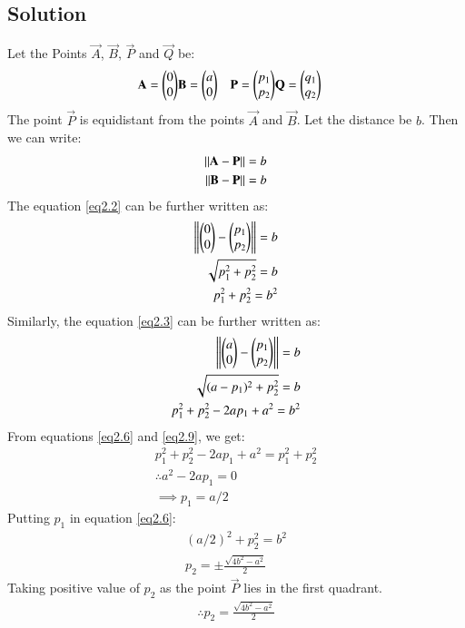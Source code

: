 \documentclass[journal,12pt,twocolumn]{IEEEtran}
\begin{document}
\subsection{Solution}
Let the Points $\vec{A}$, $\vec{B}$, $\vec{P}$ and $\vec{Q}$ be:
\begin{align}
    \mathbf{A}=\begin{pmatrix}0 \\ 0\end{pmatrix} & \mathbf{B}=\begin{pmatrix}a \\ 0\end{pmatrix} & \mathbf{P}=\begin{pmatrix}p_1 \\ p_2\end{pmatrix}&\mathbf{Q}=\begin{pmatrix}q_1 \\ q_2\end{pmatrix}
\end{align}
The point $\vec{P}$ is equidistant from the points $\vec{A}$ and $\vec{B}$. Let the distance be $b$. Then we can write:
\begin{align}
    \left\lVert\mathbf{A}-\mathbf{P}\right\rVert=b \label{eq2.2}\\
    \left\lVert\mathbf{B}-\mathbf{P}\right\rVert=b \label{eq2.3}
\end{align}
The equation \ref{eq2.2} can be further written as:
\begin{align}
    \left\lVert\begin{pmatrix}0\\0\end{pmatrix}-\begin{pmatrix}p_1\\p_2\end{pmatrix}\right\rVert=b \\
    \sqrt{p_1^2+p_2^2}=b\\
    p_1^2+p_2^2=b^2 \label{eq2.6}
\end{align}
Similarly, the equation \ref{eq2.3} can be further written as:
\begin{align}
    \left\lVert\begin{pmatrix}a\\0\end{pmatrix}-\begin{pmatrix}p_1\\p_2\end{pmatrix}\right\rVert=b \\
    \sqrt{(a-p_1)^2+p_2^2}=b\\
    p_1^2+p_2^2-2ap_1+a^2=b^2 \label{eq2.9}
\end{align}
From equations \ref{eq2.6} and \ref{eq2.9}, we get:
\begin{align}
    p_1^2+p_2^2-2ap_1+a^2=p_1^2+p_2^2\\
    \therefore a^2-2ap_1=0\\
    \implies p_1=a/2
\end{align}
Putting $p_1$ in equation \ref{eq2.6}:
\begin{align}
   (a/2)^2+p_2^2=b^2 \\
    p_2=\pm \frac{\sqrt{4b^2-a^2}}{2}
\end{align}
Taking positive value of $p_2$ as the point $\vec{P}$ lies in the first quadrant.
\begin{align}
    \therefore p_2=\frac{\sqrt{4b^2-a^2}}{2}
\end{align}
\end{document}
